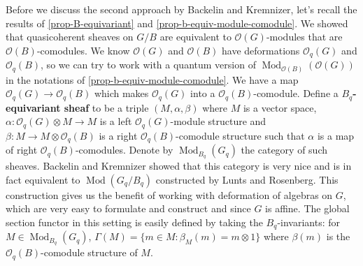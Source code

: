 \documentclass[11pt, a4paper]{article}
\theoremstyle{definition}
\newcommand{\Mod}{\operatorname{Mod}}
\begin{document}
    Before we discuss the second approach by Backelin and Kremnizer, let's recall the results of \cref{prop-B-equivariant} and \cref{prop-b-equiv-module-comodule}. We showed that quasicoherent sheaves on $G/B$ are equivalent to $\mathcal O(G)$-modules that are $\mathcal O(B)$-comodules. We know $\mathcal O(G)$ and $\mathcal O(B)$ have deformations $\mathcal O_q(G)$ and $\mathcal O_q(B)$, so we can try to work with a quantum version of $\Mod_{\mathcal O(B)}(\mathcal O(G))$ in the notations of \cref{prop-b-equiv-module-comodule}. We have a map $\mathcal O_q(G)\to \mathcal O_q(B)$ which makes $\mathcal O_q(G)$ into a $\mathcal O_q(B)$-comodule. Define a \textbf{$B_q$-equivariant sheaf} to be a triple $(M, \alpha,\beta)$ where $M$ is a vector space, $\alpha:\mathcal O_q(G)\otimes M\to M$ is a left $\mathcal O_q(G)$-module structure and $\beta:M\to M\otimes \mathcal O_q(B)$ is a right $\mathcal O_q(B)$-comodule structure such that $\alpha$ is a map of right $\mathcal O_q(B)$-comodules. Denote by $\Mod_{B_q}(G_q)$ the category of such sheaves. Backelin and Kremnizer showed that this category is very nice and is in fact equivalent to $\Mod(G_q/B_q)$ constructed by Lunts and Rosenberg. This construction gives us the benefit of working with deformation of algebras on $G$, which are very easy to formulate and construct and since $G$ is affine. The global section functor in this setting is easily defined by taking the $B_q$-invariants: for $M\in\Mod_{B_q}(G_q)$, $\Gamma(M)=\{m\in M:\beta_M(m)=m\otimes 1\}$ where $\beta(m)$ is the $\mathcal O_q(B)$-comodule structure of $M$.
    
\end{document}
